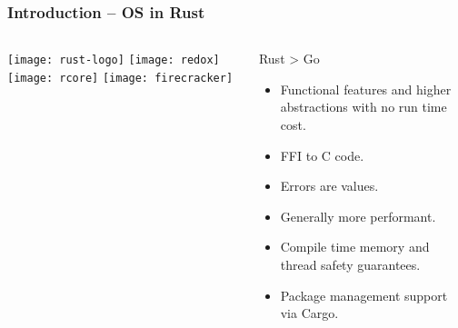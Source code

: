 \begin{frame}[plain]
	\frametitle{Introduction -- OS in Rust}
	
	
	
	\begin{columns}
		
		\begin{column}{.2\textwidth}
			
			\texttt{[image: rust-logo]}
			\texttt{[image: redox]}
			\texttt{[image: rcore]}
			\texttt{[image: firecracker]}
		\end{column}
		
		\begin{column}{.8\textwidth}
			
			Rust > Go
			
			\begin{itemize}
				
				\item  Functional features and higher abstractions with no run time cost.
				
				\item FFI to C code.
				
				\item Errors are values.
				
				\item  Generally more performant.
				
				\item Compile time memory and thread safety guarantees.
				
				\item Package management support via Cargo.
			\end{itemize}
			
		\end{column}
		
		
	\end{columns}
	
	
\end{frame}


